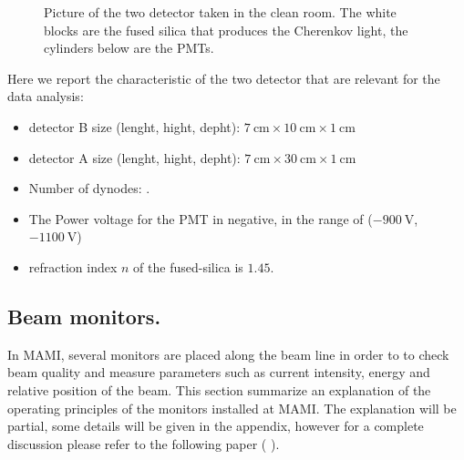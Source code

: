\begin{figure}[hbtp]
\centering
{} \quad
{} \quad
	\label{fig:Detectors}
\caption{Picture of the two detector taken in the clean room. The white blocks are the fused silica that produces the Cherenkov light, the cylinders below are the PMTs.}
\end{figure}

Here we report the characteristic of the two detector that are relevant for the data analysis: 

\begin{itemize}
\item detector B size (lenght, hight, depht): $\SI{7}{\centi \meter} \times \SI{10}{\centi \meter} \times \SI{1}{\centi \meter}$
\item detector A size (lenght, hight, depht): $\SI{7}{\centi \meter} \times \SI{30}{\centi \meter} \times \SI{1}{\centi \meter}$
\item Number of dynodes: .
\item The Power voltage for the PMT in negative, in the range of ($\SI{-900}{\volt}$, $\SI{-1100}{\volt}$)
\item refraction index $n$ of the fused-silica is $1.45$.
\end{itemize}


\subsection{Beam monitors.}

In MAMI, several monitors are placed along the beam line in order to to check beam quality and measure parameters such as current intensity, energy and relative position of the beam. This section summarize an explanation of the operating principles of the monitors installed at MAMI. The explanation will be partial, some details will be given in the appendix, however for a complete discussion please refer to the following paper ( \cite{M_Dehn}).

